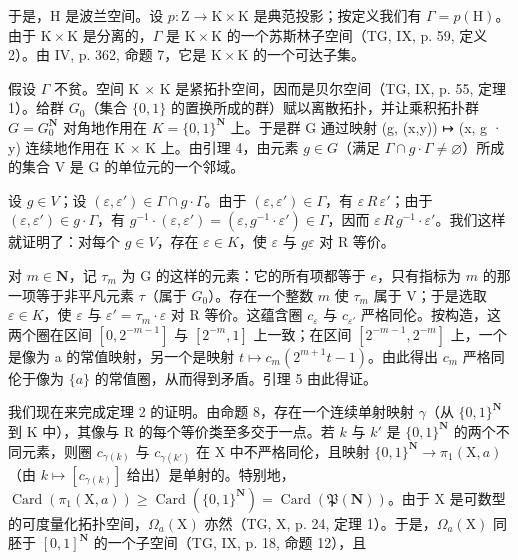 于是，H 是波兰空间。设 \(p \colon \mathrm{Z} \to \mathrm{K} \times \mathrm{K}\) 是典范投影；按定义我们有 \(\Gamma = p(\mathrm{H})\)。由于 \(\mathrm{K} \times \mathrm{K}\) 是分离的，\(\Gamma\) 是 \(\mathrm{K} \times \mathrm{K}\) 的一个苏斯林子空间（TG, IX, p. 59, 定义 2）。由 IV, p. 362, 命题 7，它是 \(\mathrm{K} \times \mathrm{K}\) 的一个可达子集。

假设 \(\Gamma\) 不贫。空间 K × K 是紧拓扑空间，因而是贝尔空间（TG, IX, p. 55, 定理 1）。给群 \(G_{0}\)（集合 \(\{0,1\}\) 的置换所成的群）赋以离散拓扑，并让乘积拓扑群 \(G = G_{0}^{\mathbf{N}}\) 对角地作用在 \(K = \{0,1\}^{\mathbf{N}}\) 上。于是群 G 通过映射 (g, (x,y)) ↦ (x, g · y) 连续地作用在 K × K 上。由引理 4，由元素 \(g \in G\)（满足 \(\Gamma \cap g \cdot \Gamma \neq \varnothing\)）所成的集合 V 是 G 的单位元的一个邻域。

设 \(g \in V\)；设 \((\varepsilon, \varepsilon') \in \Gamma \cap g \cdot \Gamma\)。由于 \((\varepsilon, \varepsilon') \in \Gamma\)，有 \(\varepsilon\,R\,\varepsilon'\)；由于 \((\varepsilon, \varepsilon') \in g \cdot \Gamma\)，有 \(g^{-1} \cdot (\varepsilon, \varepsilon') = (\varepsilon, g^{-1}\cdot\varepsilon') \in \Gamma\)，因而 \(\varepsilon\,R\,g^{-1}\cdot\varepsilon'\)。我们这样就证明了：对每个 \(g \in V\)，存在 \(\varepsilon \in K\)，使 \(\varepsilon\) 与 \(g\varepsilon\) 对 R 等价。

对 \(m \in \mathbf{N}\)，记 \(\tau_m\) 为 G 的这样的元素：它的所有项都等于 \(e\)，只有指标为 \(m\) 的那一项等于非平凡元素 \(\tau\)（属于 \(G_0\)）。存在一个整数 \(m\) 使 \(\tau_m\) 属于 V；于是选取 \(\varepsilon \in K\)，使 \(\varepsilon\) 与 \(\varepsilon' = \tau_m \cdot \varepsilon\) 对 R 等价。这蕴含圈 \(c_{\varepsilon}\) 与 \(c_{\varepsilon'}\) 严格同伦。按构造，这两个圈在区间 \([0, 2^{-m-1}]\) 与 \([2^{-m}, 1]\) 上一致；在区间 \([2^{-m-1}, 2^{-m}]\) 上，一个是像为 a 的常值映射，另一个是映射 \(t \mapsto c_{m}(2^{m+1}t - 1)\)。由此得出 \(c_{m}\) 严格同伦于像为 \(\{a\}\) 的常值圈，从而得到矛盾。引理 5 由此得证。

我们现在来完成定理 2 的证明。由命题 8，存在一个连续单射映射 \(\gamma\)（从 \(\{0,1\}^{\mathbf{N}}\) 到 K 中），其像与 R 的每个等价类至多交于一点。若 \(k\) 与 \(k'\) 是 \(\{0,1\}^{\mathbf{N}}\) 的两个不同元素，则圈 \(c_{\gamma(k)}\) 与 \(c_{\gamma(k')}\) 在 X 中不严格同伦，且映射 \(\{0,1\}^{\mathbf{N}} \to \pi_1(\mathrm{X},a)\)（由 \(k \mapsto [c_{\gamma(k)}]\) 给出）是单射的。特别地，\(\operatorname{Card}(\pi_1(\mathrm{X},a)) \geqslant \operatorname{Card}(\{0,1\}^{\mathbf{N}}) = \operatorname{Card}(\mathfrak{P}(\mathbf{N}))\)。由于 X 是可数型的可度量化拓扑空间，\(\Omega_a(\mathrm{X})\) 亦然（TG, X, p. 24, 定理 1）。于是，\(\Omega_a(\mathrm{X})\) 同胚于 \([0,1]^{\mathbf{N}}\) 的一个子空间（TG, IX, p. 18, 命题 12），且

